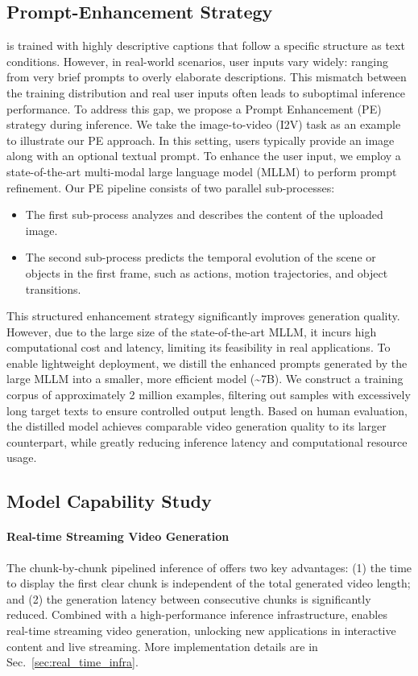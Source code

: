 \subsection{Prompt-Enhancement Strategy}
\magi is trained with highly descriptive captions that follow a specific structure as text conditions. However, in real-world scenarios, user inputs vary widely: ranging from very brief prompts to overly elaborate descriptions. This mismatch between the training distribution and real user inputs often leads to suboptimal inference performance. To address this gap, we propose a Prompt Enhancement (PE) strategy during inference.
We take the image-to-video (I2V) task as an example to illustrate our PE approach. In this setting, users typically provide an image along with an optional textual prompt. To enhance the user input, we employ a state-of-the-art multi-modal large language model (MLLM) to perform prompt refinement. Our PE pipeline consists of two parallel sub-processes:
\begin{itemize}
    \item The first sub-process analyzes and describes the content of the uploaded image.
    \item The second sub-process predicts the temporal evolution of the scene or objects in the first frame, such as actions, motion trajectories, and object transitions.
\end{itemize}
This structured enhancement strategy significantly improves generation quality. However, due to the large size of the state-of-the-art MLLM, it incurs high computational cost and latency, limiting its feasibility in real applications.
To enable lightweight deployment, we distill the enhanced prompts generated by the large MLLM into a smaller, more efficient model (\textasciitilde7B). We construct a training corpus of approximately 2 million examples, filtering out samples with excessively long target texts to ensure controlled output length. Based on human evaluation, the distilled model achieves comparable video generation quality to its larger counterpart, while greatly reducing inference latency and computational resource usage.




\subsection{Model Capability Study}
\label{sec:model_capability_study}
\paragraph{Real-time Streaming Video Generation}
The chunk-by-chunk pipelined inference of \magi offers two key advantages: (1) the time to display the first clear chunk is independent of the total generated video length; and (2) the generation latency between consecutive chunks is significantly reduced. Combined with a high-performance inference infrastructure, \magi enables real-time streaming video generation, unlocking new applications in interactive content and live streaming. More implementation details are in Sec.~\ref{sec:real_time_infra}.


